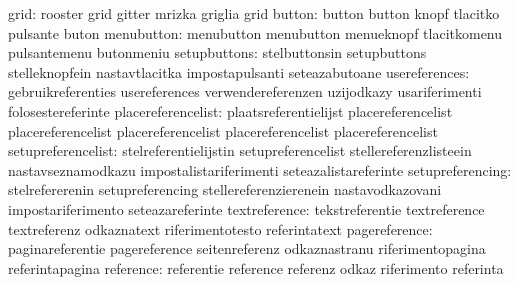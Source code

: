                             grid: rooster                          grid
                                  gitter                           mrizka
                                  griglia                          grid
                          button: button                           button
                                  knopf                            tlacitko
                                  pulsante                         buton
                      menubutton: menubutton                       menubutton
                                  menueknopf                       tlacitkomenu
                                  pulsantemenu                     butonmeniu
                    setupbuttons: stelbuttonsin                    setupbuttons
                                  stelleknopfein                   nastavtlacitka
                                  impostapulsanti                  seteazabutoane
                   usereferences: gebruikreferenties               usereferences
                                  verwendereferenzen               uzijodkazy
                                  usariferimenti                   folosestereferinte
              placereferencelist: plaatsreferentielijst            placereferencelist
                                  placereferencelist               placereferencelist
                                  placereferencelist               placereferencelist
              setupreferencelist: stelreferentielijstin            setupreferencelist
                                  stellereferenzlisteein           nastavseznamodkazu
                                  impostalistariferimenti          seteazalistareferinte
                setupreferencing: stelrefererenin                  setupreferencing
                                  stellereferenzierenein           nastavodkazovani
                                  impostariferimento               seteazareferinte
                   textreference: tekstreferentie                  textreference
                                  textreferenz                     odkaznatext
                                  riferimentotesto                 referintatext
                   pagereference: paginareferentie                 pagereference
                                  seitenreferenz                   odkaznastranu
                                  riferimentopagina                referintapagina
                       reference: referentie                       reference
                                  referenz                         odkaz
                                  riferimento                      referinta
